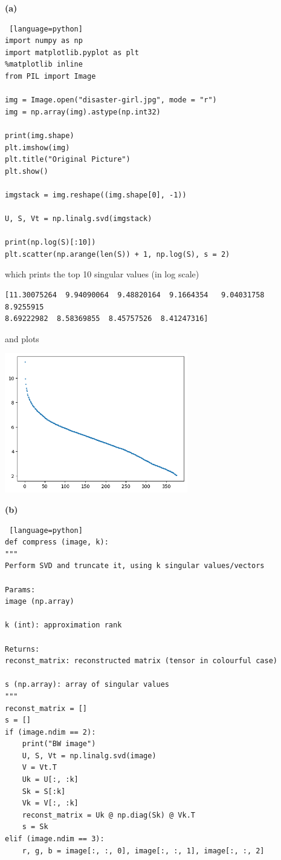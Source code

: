 \documentclass[a4paper, 12pt]{article}
\begin{document}
\begin{problem} [Problem 3]
\end{problem}
\begin{solution}

    \textbf{(a)}    
\begin{lstlisting} [language=python]
import numpy as np
import matplotlib.pyplot as plt
%matplotlib inline
from PIL import Image

img = Image.open("disaster-girl.jpg", mode = "r")
img = np.array(img).astype(np.int32)

print(img.shape)
plt.imshow(img)
plt.title("Original Picture")
plt.show()

imgstack = img.reshape((img.shape[0], -1))

U, S, Vt = np.linalg.svd(imgstack)

print(np.log(S)[:10])
plt.scatter(np.arange(len(S)) + 1, np.log(S), s = 2)
\end{lstlisting}
which prints the top 10 singular values (in log scale)
\begin{lstlisting}
[11.30075264  9.94090064  9.48820164  9.1664354   9.04031758  8.9255915
8.69222982  8.58369855  8.45757526  8.41247316]
\end{lstlisting}
and plots
    \begin{center}
    \includegraphics[width=8cm]{./figures/5.3a.png}
    \end{center}

    \textbf{(b)}
\begin{lstlisting} [language=python]
def compress (image, k):
"""
Perform SVD and truncate it, using k singular values/vectors

Params:
image (np.array)

k (int): approximation rank

Returns:
reconst_matrix: reconstructed matrix (tensor in colourful case)

s (np.array): array of singular values
"""
reconst_matrix = []
s = []
if (image.ndim == 2):
    print("BW image")
    U, S, Vt = np.linalg.svd(image)
    V = Vt.T
    Uk = U[:, :k]
    Sk = S[:k]
    Vk = V[:, :k]
    reconst_matrix = Uk @ np.diag(Sk) @ Vk.T
    s = Sk
elif (image.ndim == 3):
    r, g, b = image[:, :, 0], image[:, :, 1], image[:, :, 2]
    

\end{lstlisting}
\end{solution}
\end{document}

